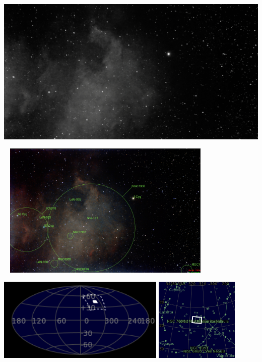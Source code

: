 {\footnotesize\color{white}


}\ \\
\includegraphics[width=\textwidth]{../Imaging//Grayscale/Northamerica_Nebula.jpg}
\begin{center}
 \ \newpage
\includegraphics[width=0.75\textwidth]{../Imaging//Annotated/Northamerica_Nebula_Annotated.jpg}

\includegraphics[height=4cm]{../Imaging//Annotated/Northamerica_Nebula_Globe.jpg}
\includegraphics[height=4cm]{../Imaging//Annotated/Northamerica_Nebula_Close.jpg}
\end{center}
